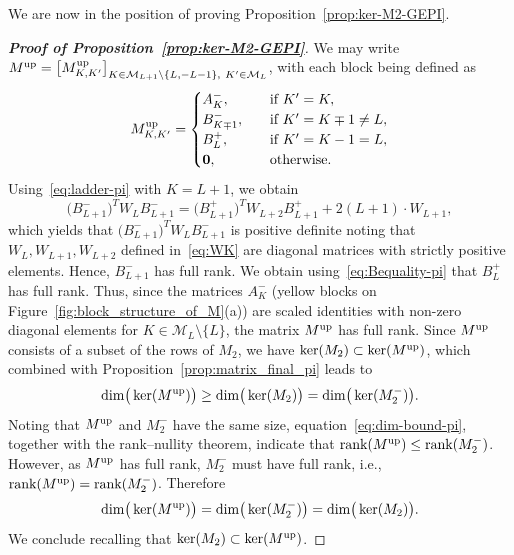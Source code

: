 \documentclass{article}
\numberwithin{equation}{section}
\def\calM{\mathcal{M}}
\def\MlL{{M}}
\def\dim{{{\rm dim}}}
\def\Mm{M^{-}}
\def\Am{A^{-}}
\def\Bp{B^{+}}
\def\Bm{B^{-}}
\def\Mup{{\MlL}^{\textup{up}}}
\begin{document}
We are now in the position of proving Proposition~\ref{prop:ker-M2-GEPI}. 


\begin{proof}[\bf{Proof of Proposition~\ref{prop:ker-M2-GEPI}}]
    We may write
    $\Mup=\big[\Mup_{K,K'}\big]_{K\in\calM_{L+1}\backslash \{L,-L-1\},~K'\in\calM_L}$, with each block being defined as
        \begin{equation*}
        \Mup_{K,K'} = \begin{cases}
            \Am_{K}, 
            \quad & \textup{if } K'=K, \\
            \Bm_{K\mp1}, 
            \quad & \textup{if } K'=K\mp1\ne L, \\
            \Bp_{L}, 
            \quad & \textup{if } K'=K-1=L, \\
            \mathbf{0}, \quad &\textup{otherwise.}
            \end{cases}
        \end{equation*}
    Using~\eqref{eq:ladder-pi} with $K=L+1$, 
    we obtain 
    \begin{equation*}
        \big(\Bm_{L+1}\big)^TW_{L}\Bm_{L+1} = \big(\Bp_{L+1}\big)^TW_{L+2}\Bp_{L+1} + 2(L+1)\cdot W_{L+1},
    \end{equation*}
    which yields that $\big(\Bm_{L+1}\big)^TW_{L}\Bm_{L+1}$
    is positive definite noting that $W_L,W_{L+1},W_{L+2}$ defined in~\eqref{eq:WK} are diagonal matrices with strictly positive elements. Hence, $\Bm_{L+1}$ has full rank. We obtain using~\eqref{eq:Bequality-pi} that $\Bp_{L}$ has full rank.
    Thus, since the matrices $\Am_{K}$ 
    (yellow blocks on Figure~\ref{fig:block_structure_of_M}(a)) are scaled identities with non-zero diagonal elements for $K\in\calM_L\setminus \{L\}$, the matrix $\Mup$ has full rank.
    Since $\Mup$ consists of a subset of the rows of $\MlL_2$, we have $\ker(\MlL_2)\subset\ker(\Mup)$, which combined with Proposition~\ref{prop:matrix_final_pi} leads to
    \begin{equation}\label{eq:dim-bound-pi}
        \dim\big(\ker(\Mup)\big)\ge \dim\big(\ker(\MlL_2)\big)=\dim\big(\ker(\Mm_2)\big).
    \end{equation}
    Noting that $\Mup$ and $\Mm_2$ have the same size, equation~\eqref{eq:dim-bound-pi}, together with the rank–nullity theorem, indicate that $\text{rank}(\Mup)\le\text{rank}(\Mm_2)$. However, as $\Mup$ has full rank, $\Mm_2$ must have full rank, i.e., $\text{rank}(\Mup)=\text{rank}(\Mm_2)$. Therefore
    \[
        \dim\big(\ker(\Mup)\big)=\dim\big(\ker(\Mm_2)\big) = \dim\big(\ker(\MlL_2)\big).
    \]
    We conclude recalling that $\ker(\MlL_2)\subset\ker(\Mup)$.
\end{proof}
\end{document}
